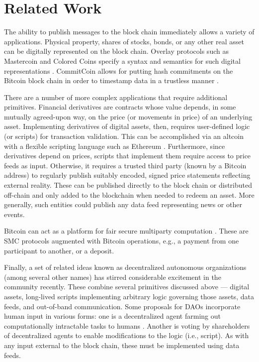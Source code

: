 \section{Related Work}
\label{sec:related}

The ability to publish messages to the block chain immediately allows a variety of applications. Physical property, shares of stocks, bonds, or any other real asset can be digitally represented on the block chain. Overlay protocols such as Mastercoin and Colored Coins specify a syntax and semantics for such digital representations \cite{mastercoinspec, rosenfeld2012overview}. CommitCoin allows for putting hash commitments on the Bitcoin block chain in order to timestamp data in a trustless manner \cite{clark2012commitcoin}. 

There are a number of more complex applications that require additional primitives. Financial derivatives are contracts whose value depends, in some mutually agreed-upon way, on the price (or movements in price) of an underlying asset. Implementing derivatives of digital assets, then, requires user-defined logic (or scripts) for transaction validation. This can be accomplished via an altcoin with a flexible scripting language such as Ethereum \cite{ethereumwhitepaper}. Furthermore, since derivatives depend on prices, scripts that implement them require access to price feeds as input. Otherwise, it requires a trusted third party (known by a Bitcoin address) to regularly publish suitably encoded, signed price statements reflecting external reality. These can be published directly to the block chain or distributed off-chain and only added to the blockchain when needed to redeem an asset. More generally, such entities could publish any data feed representing news or other events.

Bitcoin can act as a platform for fair secure multiparty computation \cite{andrychowicz2014secure, bentov2014use, kumaresan2014use}. These are SMC protocols augmented with Bitcoin operations, e.g., a payment from one participant to another, or a deposit.

Finally, a set of related ideas known as decentralized autonomous organizations (among several other names) has stirred considerable excitement in the community recently. These combine several primitives discussed above --- digital assets, long-lived scripts implementing arbitrary logic governing those assets, data feeds, and out-of-band communication. Some proposals for DAOs incorporate human input in various forms: one is a decentralized agent farming out computationally intractable tasks to humans \cite{buterindao}. Another is voting by shareholders of decentralized agents to enable modifications to the logic (i.e., script). As with any input external to the block chain, these must be implemented using data feeds.

